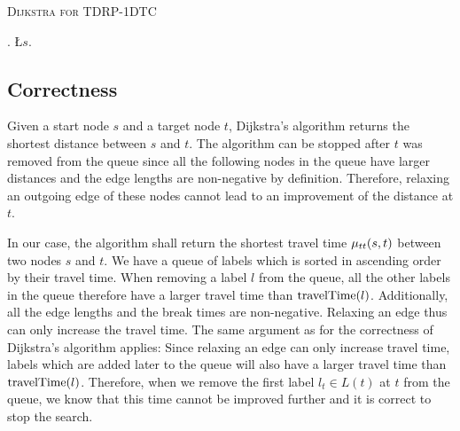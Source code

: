 \begin{algorithm}[htbt]
	\caption{\textsc{Dijkstra for TDRP-1DTC}}\label{alg:CSP}

	\DontPrintSemicolon %



	\BlankLine
	\Q.\;
	\L{$s$}.\;
	\BlankLine
	{
		\SettleNextLabel{}\;

		{
			\Return\;
		}
	}
\end{algorithm}

\subsection{Correctness\label{sec:dijkstra_csp_correctness}}
Given a start node $s$ and a target node $t$, Dijkstra's algorithm returns the shortest distance between $s$ and $t$. The algorithm can be stopped after $t$ was removed from the queue since all the following nodes in the queue have larger distances and the edge lengths are non-negative by definition. Therefore, relaxing an outgoing edge of these nodes cannot lead to an improvement of the distance at $t$.

In our case, the algorithm shall return the shortest travel time $\mu_{tt}(s,t)$ between two nodes $s$ and $t$. We have a queue of labels which is sorted in ascending order by their travel time. When removing a label $l$ from the queue, all the other labels in the queue therefore have a larger travel time than $\operatorname{travelTime}(l)$. Additionally, all the edge lengths and the break times are non-negative. Relaxing an edge thus can only increase the travel time. The same argument as for the correctness of Dijkstra's algorithm applies: Since relaxing an edge can only increase travel time, labels which are added later to the queue will also have a larger travel time than $\operatorname{travelTime}(l)$. Therefore, when we remove the first label $l_t \in L(t)$ at $t$ from the queue, we know that this time cannot be improved further and it is correct to stop the search.

